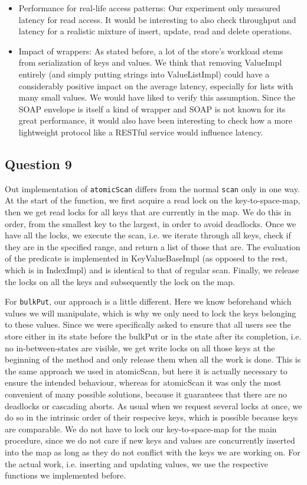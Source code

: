 \documentclass[12pt,a4paper]{article}
\begin{document}
\begin{itemize}
  \item Performance for real-life access patterns: Our experiment only measured latency for read access. It would be interesting to also check throughput and latency for a realistic mixture of insert, update, read and delete operations.
  \item Impact of wrappers: As stated before, a lot of the store's workload stems from serialization of keys and values. We think that removing ValueImpl entirely (and simply putting strings into ValueListImpl) could have a considerably positive impact on the average latency, especially for lists with many small values. We would have liked to verify this assumption. Since the SOAP envelope is itself a kind of wrapper and SOAP is not known for its great performance, it would also have been interesting to check how a more lightweight protocol like a RESTful service would influence latency.
  
\end{itemize}

\subsection*{Question 9}
\label{sec:pq9}
Out implementation of \texttt{atomicScan} differs from the normal \texttt{scan} only in one way. At the start of the function, we first acquire a read lock on the key-to-space-map, then we get read locks for all keys that are currently in the map. We do this in order, from the smallest key to the largest, in order to avoid deadlocks. Once we have all the locks, we execute the scan, i.e. we iterate through all keys, check if they are in the specified range, and return a list of those that are. The evaluation of the predicate is implemented in KeyValueBaseImpl (as opposed to the rest, which is in IndexImpl) and is identical to that of regular scan. Finally, we release the locks on all the keys and subsequently the lock on the map.

For \texttt{bulkPut}, our approach is a little different. Here we know beforehand which values we will manipulate, which is why we only need to lock the keys belonging to these values. Since we were specifically asked to ensure that all users see the store either in its state before the bulkPut or in the state after its completion, i.e. no in-between-states are visible, we get write locks on all those keys at the beginning of the method and only release them when all the work is done. This is the same approach we used in atomicScan, but here it is actually necessary to ensure the intended behaviour, whereas for atomicScan it was only the most convenient of many possible solutions, because it guarantees that there are no deadlocks or cascading aborts. As usual when we request several locks at once, we do so in the intrinsic order of their respecive keys, which is possible because keys are comparable. We do not have to lock our key-to-space-map for the main procedure, since we do not care if new keys and values are concurrently inserted into the map as long as they do not conflict with the keys we are working on. For the actual work, i.e. inserting and updating values, we use the respective functions we implemented before.
 
\end{document}
